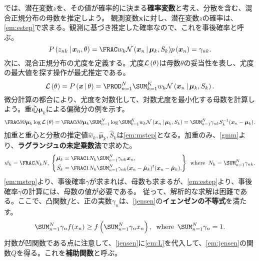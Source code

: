 \documentclass[10pt,a4paper]{book}
\begin{document}
では、潜在変数$z$を、その値が確率的に決まる\textbf{確率変数}と考え、分散を含む、混合正規分布の母数を推定しよう。
観測変数$\bm{x}$に対し、潜在変数$z$の確率は、\eqref{em:estep}で求まる。観測に基づき推定した確率なので、これを事後確率と呼ぶ。
%
\begin{equation}
\label{eq:em:estep}
\Prob{z_{nk}}[\bm{x}_n,\theta] = \frac{w_k \Nd{\bm{x}_n}{\bm{\mu}_k,S_k}}{\prob{\bm{x}_n}} = \gamma_{nk}.
\end{equation}
%
次に、混合正規分布の尤度を定義する。尤度$\mathcal{L}\left(\theta\right)$は母数$\theta$の妥当性を表し、尤度の最大値を探す操作が最尤推定である。
%
\begin{equation}
\label{eq:em:L}
\Lk{\theta} =
\Prob{\bm{x}}[\theta] =
\prod_{n=1}^N \sum_{k=1}^K w_k \Nd{\bm{x}_n}{\bm{\mu}_k,S_k}.
\end{equation}
%
微分計算の都合により、尤度を対数化して、対数尤度を最小化する母数を計算しよう。重心$\bm{\mu}_k$による偏微分の例を示す。
%
\begin{equation}
\label{eq:em:L:m}
\pdiff{}{\bm{\mu}_k}\log\Lk{\theta} =
\pdiff{}{\bm{\mu}_k}\sum_{n=1}^N \log\sum_{k=1}^K w_k \Nd{\bm{x}_n}{\bm{\mu}_k,S_k} =
\sum_{n=1}^N \gamma_{nk} S_k^{-1} (\bm{x}_n - \bm{\mu}_k).
\end{equation}
%
加重と重心と分散の推定値$\hat{w}_k,\hat{\bm{\mu}}_k,\hat{S}_k$は\eqref{em:mstep}となる。加重のみ、\eqref{gmm}より、\textbf{ラグランジュの未定乗数法}で求めた。
%
\begin{equation}
\label{eq:em:mstep}
\hat{w_k} = \frac{N_k}{N},\esp
\left\{
\begin{aligned}
\hat{\bm{\mu}_k} &= \frac{1}{N_k} \sum_{n=1}^N \gamma_{nk} \bm{x}_n,\\
\hat{S_k} &= \frac{1}{N_k} \sum_{n=1}^N \gamma_{nk} (\bm{x}_n - \hat{\bm{\mu}}_k) \trans{(\bm{x}_n - \hat{\bm{\mu}}_k)},
\end{aligned}
\right\}
\where
N_k = \sum_{n=1}^N \gamma_{nk}.
\end{equation}
%
\eqref{em:mstep}より、事後確率$\gamma$が求まれば、母数も求まるが、\eqref{em:estep}より、事後確率$\gamma$の計算には、母数の値が必要である。
従って、解析的な求解は困難である。ここで、凸関数$f$と、正の実数$\gamma_n$は、\eqref{jensen}の\textbf{イェンゼンの不等式}を満たす。
%
\begin{equation}
\label{eq:jensen}
\sum_{n=1}^N \gamma_n f(x_n) \geq f\tup{\sum_{n=1}^N \gamma_n x_n},
\where
\sum_{n=1}^N \gamma_n=1.
\end{equation}
%
対数が凹関数である点に注意して、\eqref{jensen}に\eqref{em:L}を代入して、\eqref{em:jensen}の関数$Q$を得る。これを\textbf{補助関数}と呼ぶ。
\end{document}
